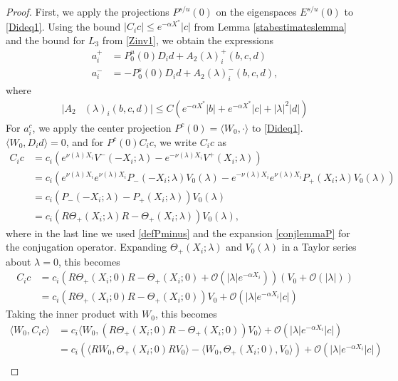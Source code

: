 \documentclass[thesis.tex]{subfiles}
\begin{document}
\begin{lemma}
\begin{proof}
First, we apply the projections $P^{s/u}(0)$ on the eigenspaces $E^{s/u}(0)$ to \eqref{Dideq1}. Using the bound $|C_i c| \leq e^{-\alpha X^*}|c|$ from Lemma \ref{stabestimateslemma} and the bound for $L_3$ from \cref{Zinv1}, we obtain the expressions
\begin{align*}
a_i^+ &= P_0^u(0) D_i d + A_2(\lambda)_i^+(b, c, d) \\
a_i^- &= -P_0^s(0) D_i d + A_2(\lambda)_i^-(b, c, d),
\end{align*}
where 
\begin{align*}
|A_2&(\lambda)_i(b, c, d)| \leq C \left(e^{-\alpha X^*}|b| + e^{-\alpha X^*}|c| + |\lambda|^2|d| \right)
\end{align*} 
For $a_i^c$, we apply the center projection $P^c(0) = \langle W_0, \cdot \rangle$ to \eqref{Dideq1}. $\langle W_0, D_i d\rangle = 0$, and for $P^c(0) C_i c$, we write $C_i c$ as 
\begin{align*}
C_i c &= c_i \left( e^{\nu(\lambda) X_i} V^-(-X_i; \lambda) - e^{-\nu(\lambda) X_i} V^+(X_i; \lambda) \right) \\
&= c_i \left( e^{\nu(\lambda) X_i} e^{\nu(\lambda)X_i} P_-(-X_i; \lambda) V_0(\lambda) - e^{-\nu(\lambda) X_i} e^{\nu(\lambda)X_i} P_+(X_i; \lambda)V_0(\lambda) \right) \\
&= c_i \left( P_-(-X_i; \lambda) - P_+(X_i; \lambda) \right) V_0(\lambda) \\
&= c_i \left( R \Theta_+(X_i; \lambda) R - \Theta_+(X_i; \lambda) \right) V_0(\lambda),
\end{align*}
where in the last line we used \cref{defPminus} and the expansion \cref{conjlemmaP} for the conjugation operator. Expanding $\Theta_+(X_i; \lambda)$ and $V_0(\lambda)$ in a Taylor series about $\lambda = 0$, this becomes
\begin{align*}
C_i c &= c_i \left( R \Theta_+(X_i; 0) R - \Theta_+(X_i; 0) + \mathcal{O}(|\lambda|e^{-\alpha X_i}) \right) (V_0 + \mathcal{O}(|\lambda|)) \\
&= c_i \left( R \Theta_+(X_i; 0) R - \Theta_+(X_i; 0) \right) V_0 + \mathcal{O}(|\lambda|e^{-\alpha X_i}|c|)
\end{align*}
Taking the inner product with $W_0$, this becomes
\begin{align*}
\langle W_0, C_i c \rangle &=  c_i \langle W_0, \left( R \Theta_+(X_i; 0) R - \Theta_+(X_i; 0) \right) V_0 \rangle + \mathcal{O}(|\lambda|e^{-\alpha X_i}|c| ) \\
&= c_i \left( \langle R W_0, \Theta_+(X_i; 0) R V_0 \rangle - \langle W_0, \Theta_+(X_i; 0), V_0 \rangle \right) + \mathcal{O}(|\lambda|e^{-\alpha X_i}|c| ) \\

\end{align*}
\end{proof}
\end{lemma}
\end{document}
